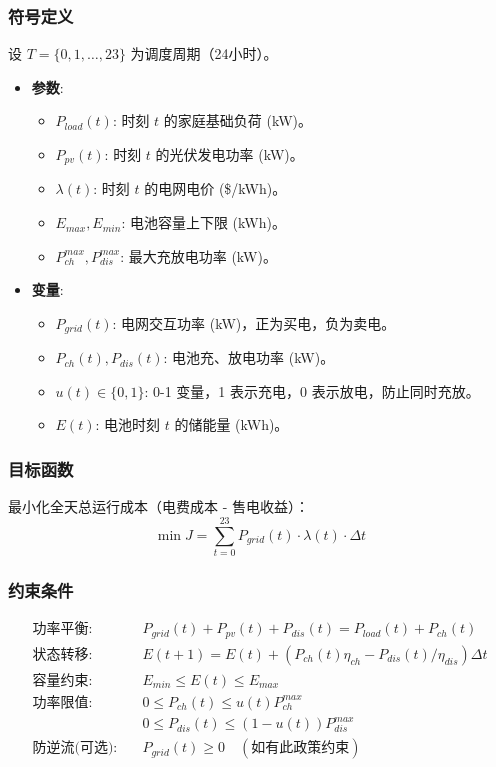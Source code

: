 \subsubsection{符号定义}
设 $T = \{0, 1, \dots, 23\}$ 为调度周期（24小时）。
\begin{itemize}
    \item \textbf{参数}:
          \begin{itemize}
              \item $P_{load}(t)$: 时刻 $t$ 的家庭基础负荷 (kW)。
              \item $P_{pv}(t)$: 时刻 $t$ 的光伏发电功率 (kW)。
              \item $\lambda(t)$: 时刻 $t$ 的电网电价 (\$/kWh)。
              \item $E_{max}, E_{min}$: 电池容量上下限 (kWh)。
              \item $P_{ch}^{max}, P_{dis}^{max}$: 最大充放电功率 (kW)。
          \end{itemize}
    \item \textbf{变量}:
          \begin{itemize}
              \item $P_{grid}(t)$: 电网交互功率 (kW)，正为买电，负为卖电。
              \item $P_{ch}(t), P_{dis}(t)$: 电池充、放电功率 (kW)。
              \item $u(t) \in \{0, 1\}$: 0-1 变量，1 表示充电，0 表示放电，防止同时充放。
              \item $E(t)$: 电池时刻 $t$ 的储能量 (kWh)。
          \end{itemize}
\end{itemize}

\subsubsection{目标函数}
最小化全天总运行成本（电费成本 - 售电收益）：
\begin{equation}
    \min J = \sum_{t=0}^{23} P_{grid}(t) \cdot \lambda(t) \cdot \Delta t
\end{equation}

\subsubsection{约束条件}
\begin{align}
    \textbf{功率平衡:} \quad    & P_{grid}(t) + P_{pv}(t) + P_{dis}(t) = P_{load}(t) + P_{ch}(t)        \\
    \textbf{状态转移:} \quad    & E(t+1) = E(t) + (P_{ch}(t)\eta_{ch} - P_{dis}(t)/\eta_{dis}) \Delta t \\
    \textbf{容量约束:} \quad    & E_{min} \le E(t) \le E_{max}                                          \\
    \textbf{功率限值:} \quad    & 0 \le P_{ch}(t) \le u(t) P_{ch}^{max}                                 \\
                            & 0 \le P_{dis}(t) \le (1-u(t)) P_{dis}^{max}                           \\
    \textbf{防逆流(可选):} \quad & P_{grid}(t) \ge 0 \quad (\text{如有此政策约束})
\end{align}

